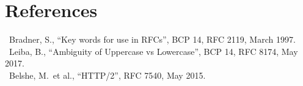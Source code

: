\section*{References}
\vspace{-4pt}
{\small\ttfamily
[RFC2119]\ Bradner, S., ``Key words for use in RFCs'', BCP 14, RFC 2119, March 1997.\\
\relax[RFC8174]\ Leiba, B., ``Ambiguity of Uppercase vs Lowercase'', BCP 14, RFC 8174, May 2017.\\
\relax[RFC7540]\ Belshe, M.\ et al., ``HTTP/2'', RFC 7540, May 2015.}
